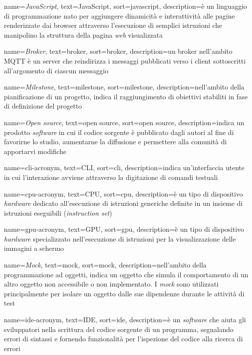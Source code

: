 {
  name=\emph{JavaScript},
  text={JavaScript},
  sort={javascript},
  description={è un linguaggio di programmazione nato per aggiungere dinamicità e interattività alle pagine renderizzate dai browser attraverso l'esecuzione di semplici istruzioni che manipolino la struttura della pagina \emph{web} visualizzata}
}

{
  name=\emph{Broker},
  text={broker},
  sort={broker},
  description={un broker nell'ambito MQTT è un server che reindirizza i messaggi pubblicati verso i client sottoscritti all'argomento di ciascun messaggio}
}

{
  name=\emph{Milestone},
  text={milestone},
  sort={milestone},
  description={nell'ambito della pianificazione di un progetto, indica il raggiungimento di obiettivi stabiliti in fase di definizione del progetto}
}

{
  name=\emph{Open source},
  text={open source},
  sort={open source},
  description={indica un prodotto \emph{software} in cui il codice sorgente è pubblicato dagli autori al fine di favorirne lo studio, aumentarne la diffusione e permettere alla comunità di apportarvi modifiche}
}

{
  name=\gls{cli-acronym},
  text=CLI,
  sort=cli,
  description={indica un'interfaccia utente in cui l'interazione avviene attraverso la digitazione di comandi testuali}
}

{
  name=\gls{cpu-acronym},
  text=CPU,
  sort=cpu,
  description={è un tipo di dispositivo \emph{hardware} dedicato all'esecuzione di istruzioni generiche definite in un insieme di istruzioni eseguibili (\emph{instruction set})}
}

{
  name=\gls{gpu-acronym},
  text=GPU,
  sort=gpu,
  description={è un tipo di dispositivo \emph{hardware} specializzato nell'esecuzione di istruzioni per la visualizzazione delle immagini a schermo}
}

{
  name=\emph{Mock},
  text=mock,
  sort=mock,
  description={nell'ambito della programmazione ad oggetti, indica un oggetto che simula il comportamento di un altro oggetto non accessibile o non implementato. I \emph{mock} sono utilizzati principalmente per isolare un oggetto dalle sue dipendenze durante le attività di test}
}

{
  name=\gls{ide-acronym},
  text=IDE,
  sort=ide,
  description={è un \emph{software} che aiuta gli sviluppatori nella scrittura del codice sorgente di un programma, segnalando errori di sintassi e fornendo funzionalità per l'ispezione del codice alla ricerca di errori}
}

